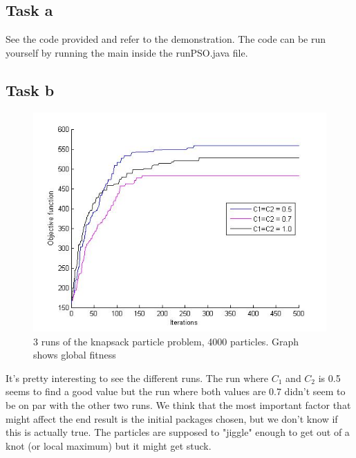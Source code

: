\documentclass[12pt, a4paper]{article}
\begin{document}
\subsection{Task a}
See the code provided and refer to the demonstration.
The code can be run yourself by running the main inside the runPSO.java file.

\subsection{Task b}
\begin{figure}[H]
\begin{center}
\includegraphics[width=18cm]{KnapSack_noInertia}
\caption{3 runs of the knapsack particle problem, 4000 particles. Graph shows global fitness}
\end{center}

\end{figure}
It's pretty interesting to see the different runs. The run where $C_1$ and $C_2$ is 0.5 seems to find a good value but the run where both values are 0.7 didn't seem to be on par with the other two runs. We think that the most important factor that might affect the end result is the initial packages chosen, but we don't know if this is actually true. The particles are supposed to "jiggle" enough to get out of a knot (or local maximum) but it might get stuck.
\end{document}
